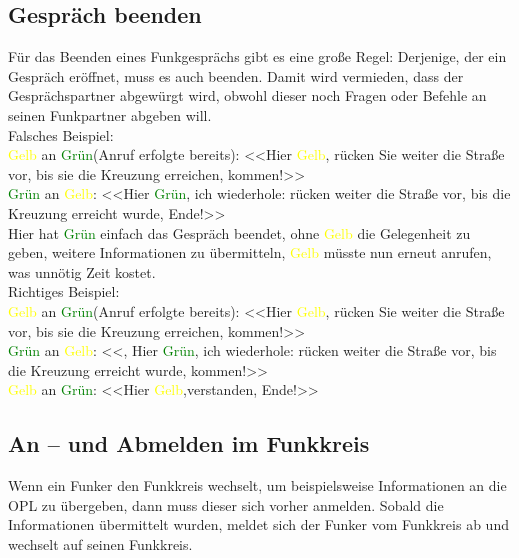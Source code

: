 \subsection{Gespräch beenden}

	Für das Beenden eines Funkgesprächs gibt es eine große Regel: Derjenige, der ein Gespräch eröffnet, muss es auch beenden. Damit wird vermieden, dass der Gesprächspartner abgewürgt wird, obwohl dieser noch Fragen oder Befehle an seinen Funkpartner abgeben will. \\
	Falsches Beispiel: \\
	\textcolor{yellow}{Gelb} an \textcolor{green}{Grün}(Anruf erfolgte bereits): <<Hier \textcolor{yellow}{Gelb}, rücken Sie weiter die Straße vor, bis sie die Kreuzung erreichen, kommen!>>  \\
	\textcolor{green}{Grün} an \textcolor{yellow}{Gelb}: <<Hier \textcolor{green}{Grün}, ich wiederhole: rücken weiter die Straße vor, bis die Kreuzung erreicht wurde, Ende!>> \\
	Hier hat \textcolor{green}{Grün} einfach das Gespräch beendet, ohne \textcolor{yellow}{Gelb} die Gelegenheit zu geben, weitere Informationen zu übermitteln, \textcolor{yellow}{Gelb} müsste nun erneut anrufen, was unnötig Zeit kostet. \\
	Richtiges Beispiel: \\
	\textcolor{yellow}{Gelb} an \textcolor{green}{Grün}(Anruf erfolgte bereits): <<Hier \textcolor{yellow}{Gelb}, rücken Sie weiter die Straße vor, bis sie die Kreuzung erreichen, kommen!>> \\
	\textcolor{green}{Grün} an \textcolor{yellow}{Gelb}: <<, Hier \textcolor{green}{Grün}, ich wiederhole: rücken weiter die Straße vor, bis die Kreuzung erreicht wurde, kommen!>> \\
	\textcolor{yellow}{Gelb} an \textcolor{green}{Grün}: <<Hier \textcolor{yellow}{Gelb},verstanden, Ende!>> \\

\subsection{An – und Abmelden im Funkkreis} \label{AnAbmeldenImFunk}

	Wenn ein Funker den Funkkreis wechselt, um beispielsweise Informationen an die OPL zu übergeben, dann muss dieser sich vorher anmelden. Sobald die Informationen übermittelt wurden, meldet sich der Funker vom Funkkreis ab und wechselt auf seinen Funkkreis. \\

